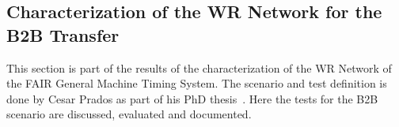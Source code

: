 %
%

\subsection{Characterization of the WR Network for the B2B Transfer}
\label{wr_network}
This section is part of the results of the characterization of the WR Network of the FAIR General Machine Timing System. The scenario and test definition is done by Cesar Prados as part of his PhD thesis~\cite{prados_rock_nodate}. Here the tests for the B2B scenario are discussed, evaluated and documented. 

